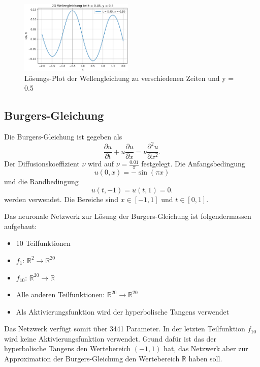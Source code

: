 \begin{figure}
    \includegraphics[width=0.48\textwidth]{papers/neuronal/images/wave_solution_t045.png}
    \caption{Lösungs-Plot der Wellengleichung zu verschiedenen Zeiten und y = 0.5}\label{fig:loesung_wellen_fix_yt}
\end{figure}

\subsection{Burgers-Gleichung}\label{neuronal:subsection:burgers_gleichung}
Die Burgers-Gleichung ist gegeben als
\begin{equation}
    \frac{\partial u}{\partial t} + u \frac{\partial u}{\partial x} = \nu \frac{\partial^2 u}{\partial x^2}.
    \label{neuronal:burgers}
\end{equation}
Der Diffusionskoeffizient \( \nu \) wird auf \( \nu = \frac{0.01}{\pi} \) festgelegt.
Die Anfangsbedingung
\begin{equation}
    u(0, x) = - \sin(\pi x)
    \label{neuronal:burgers_anfang}
\end{equation}
und die Randbedingung
\begin{equation}
    u(t, -1) = u(t, 1) = 0.
    \label{neuronal:burgers_rand}
\end{equation}
werden verwendet.
Die Bereiche sind \( x \in [-1,1] \) und \( t \in [0,1] \).

Das neuronale Netzwerk zur Lösung der Burgers-Gleichung ist folgendermassen aufgebaut:
\begin{itemize}
    \item 10 Teilfunktionen
    \item \( f_1 \): \( \mathbb{R}^2 \longrightarrow \mathbb{R}^{20} \) 
    \item \( f_{10} \): \( \mathbb{R}^{20} \longrightarrow \mathbb{R} \)
    \item Alle anderen Teilfunktionen: \( \mathbb{R}^{20} \longrightarrow \mathbb{R}^{20} \)
    \item Als Aktivierungsfunktion wird der hyperbolische Tangens verwendet
\end{itemize}
Das Netzwerk verfügt somit über 3441 Parameter.
In der letzten Teilfunktion \( f_{10} \) wird keine Aktivierungsfunktion verwendet.
Grund dafür ist das der hyperbolische Tangens den Wertebereich \((-1, 1)\) hat, das Netzwerk aber zur Approximation der Burgers-Gleichung den Wertebereich \( \mathbb{R} \) haben soll.

